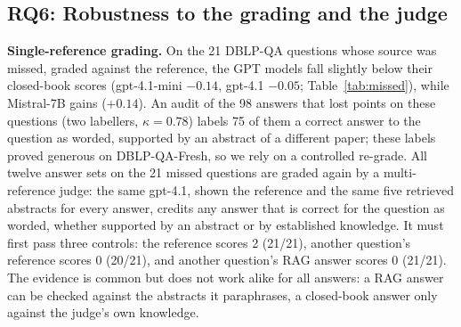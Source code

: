 \documentclass[conference]{IEEEtran}
\newcommand{\dq}{DBLP-QA}
\newcommand{\fresh}{DBLP-QA-Fresh}
\begin{document}
\subsection{RQ6: Robustness to the grading and the judge}
\label{sec:rq6}

\textbf{Single-reference grading.} On the 21 \dq{} questions whose source was missed, graded against the
reference, the GPT models fall slightly below their closed-book scores (gpt-4.1-mini $-0.14$, gpt-4.1
$-0.05$; Table~\ref{tab:missed}), while Mistral-7B gains ($+0.14$). An audit of the 98 answers that lost
points on these questions (two labellers, $\kappa=0.78$) labels 75 of them a correct answer to the
question as worded, supported by an abstract of a different paper; these labels proved generous on
\fresh{}, so we rely on a controlled re-grade. All twelve answer sets on the 21 missed questions are graded
again by a multi-reference judge: the same gpt-4.1, shown the reference and the same five retrieved
abstracts for every answer, credits any answer that is correct for the question as worded, whether
supported by an abstract or by established knowledge. It must first pass three controls: the reference
scores 2 (21/21), another question's reference scores 0 (20/21), and another question's RAG answer scores
0 (21/21). The evidence is common but does not work alike for all answers: a RAG answer can be checked
against the abstracts it paraphrases, a closed-book answer only against the judge's own knowledge.
\end{document}

